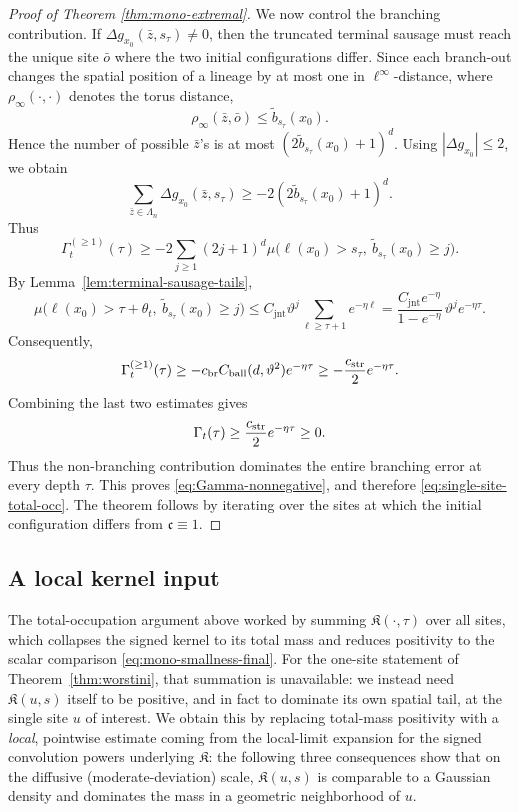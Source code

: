\documentclass[letterpaper,11pt,reqno]{amsart}
\theoremstyle{definition}
\newcommand{\IK}{\mathfrak{K}}
\begin{document}
\begin{proof}[Proof of Theorem \ref{thm:mono-extremal}]
We now control the branching contribution. If
\(\Delta g_{x_0}(\bar z,s_\tau)\neq0\), then the truncated terminal sausage must reach the unique
site \(\bar o\) where the two initial configurations differ. Since each branch-out changes the
spatial position of a lineage by at most one in \(\ell^\infty\)-distance, where $\rho_\infty(\cdot,\cdot)$ denotes the torus distance,
\[
\rho_\infty(\bar z,\bar o)\le \tilde b_{s_\tau}(x_0).
\]
Hence the number of possible \(\bar z\)'s is at most
\((2\tilde b_{s_\tau}(x_0)+1)^d\). Using \(|\Delta g_{x_0}|\le2\), we obtain
\[
\sum_{\bar z\in\Lambda_n}\Delta g_{x_0}(\bar z,s_\tau)
\ge
-2(2\tilde b_{s_\tau}(x_0)+1)^d.
\]
Thus
\[
\Gamma_t^{(\ge1)}(\tau)
\ge
-2\sum_{j\ge1}(2j+1)^d
\mu\bigl(\ell(x_0)>s_\tau,\ \tilde b_{s_\tau}(x_0)\ge j\bigr).
\]
By Lemma~\ref{lem:terminal-sausage-tails},
\[
\mu\bigl(\ell(x_0)>\tau+\theta_t,\ \tilde b_{s_\tau}(x_0)\ge j\bigr)
\le
C_{\mathrm{jnt}}\vartheta^j\sum_{\ell\ge \tau+1}e^{-\eta\ell}
=
\frac{C_{\mathrm{jnt}}e^{-\eta}}{1-e^{-\eta}}\,\vartheta^j e^{-\eta\tau}.
\]
Consequently,
\[
\Gamma_t^{(\ge1)}(\tau)
\ge
-c_{\rm br} C_{\rm ball}(d,\vartheta^2)e^{-\eta\tau}
\ge
-\frac{c_{\rm str}}2 e^{-\eta\tau}.
\]
Combining the last two estimates gives
\[
\Gamma_t(\tau)
\ge
\frac{c_{\rm str}}2e^{-\eta\tau}\ge0.
\]
Thus the non-branching contribution dominates the entire branching error at every depth \(\tau\).
This proves \eqref{eq:Gamma-nonnegative}, and therefore \eqref{eq:single-site-total-occ}.
The theorem follows by iterating over the sites at which the initial configuration differs from
\(\mathfrak c\equiv1\).


\end{proof}

\subsection{A local kernel input}

The total-occupation argument above worked by summing \(\IK(\cdot,\tau)\) over all sites, which
collapses the signed kernel to its total mass and reduces positivity to the scalar comparison
\eqref{eq:mono-smallness-final}. For the one-site statement of Theorem~\ref{thm:worstini}, that
summation is unavailable: we instead need \(\IK(u,s)\) itself to be positive, and in fact to
dominate its own spatial tail, at the single site \(u\) of interest. We obtain this by replacing
total-mass positivity with a \emph{local}, pointwise estimate coming from the local-limit
expansion for the signed convolution powers underlying \(\IK\): the following three consequences
show that on the diffusive (moderate-deviation) scale, \(\IK(u,s)\) is comparable to a Gaussian
density and dominates the mass in a geometric neighborhood of \(u\).
\end{document}
